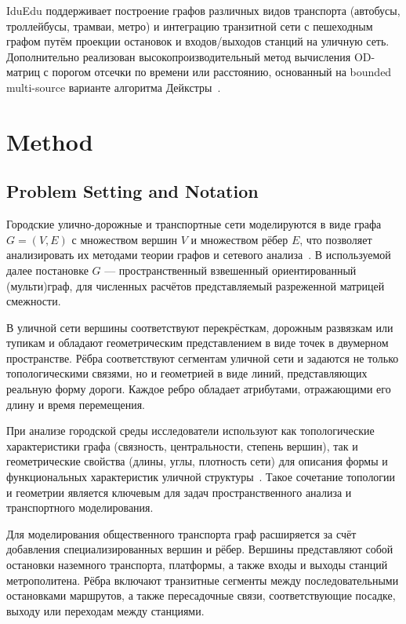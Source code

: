 \documentclass[sigconf,nonacm]{acmart}
\begin{document}
    IduEdu поддерживает построение графов различных видов транспорта (автобусы, троллейбусы, трамваи, метро)
    и интеграцию транзитной сети с пешеходным графом путём проекции остановок и входов/выходов станций на уличную сеть.
    Дополнительно реализован высокопроизводительный метод вычисления OD-матриц с порогом отсечки по времени или расстоянию,
    основанный на bounded multi-source варианте алгоритма Дейкстры~\cite{dijkstra2022note}.


    \section{Method}
    \label{sec:method}

    \subsection{Problem Setting and Notation}\label{subsec:problem-setting-and-notation}

    Городские улично-дорожные и транспортные сети моделируются в виде графа $G = (V, E)$ с множеством вершин $V$
    и множеством рёбер $E$, что позволяет анализировать их методами теории графов и сетевого
    анализа~\cite{trudeau1994graphtheory, barthelemy2011spatial, barthelemy2022spatial, newman2010networks}.
    В используемой далее постановке $G$ — пространственный взвешенный ориентированный (мульти)граф, для численных расчётов
    представляемый разреженной матрицей смежности.

    В уличной сети вершины соответствуют перекрёсткам, дорожным развязкам или тупикам и обладают геометрическим представлением в виде точек в двумерном пространстве.
    Рёбра соответствуют сегментам уличной сети и задаются не только топологическими связями, но и геометрией в виде линий, представляющих реальную форму дороги.
    Каждое ребро обладает атрибутами, отражающими его длину и время перемещения.

    При анализе городской среды исследователи используют как топологические характеристики графа (связность, центральности, степень вершин),
    так и геометрические свойства (длины, углы, плотность сети) для описания формы и функциональных характеристик уличной структуры~\cite{barthelemy2011spatial, boeing2025osmnx}.
    Такое сочетание топологии и геометрии является ключевым для задач пространственного анализа и транспортного моделирования.

    Для моделирования общественного транспорта граф расширяется за счёт добавления специализированных вершин и рёбер.
    Вершины представляют собой остановки наземного транспорта, платформы, а также входы и выходы станций метрополитена.
    Рёбра включают транзитные сегменты между последовательными остановками маршрутов, а также пересадочные связи, соответствующие посадке, выходу или переходам между станциями.
\end{document}

